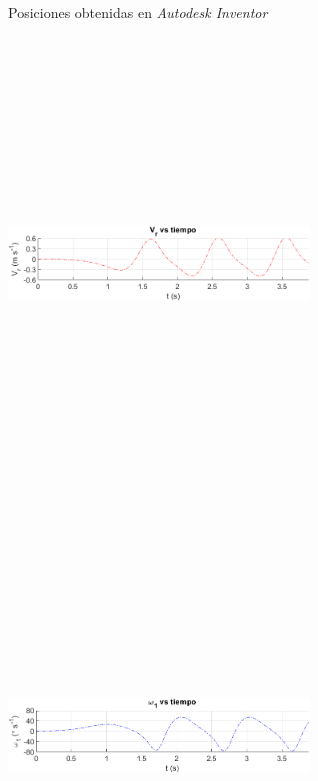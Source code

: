 \documentclass[12pt]{article}
\begin{document}
\begin{multicols}{2}
\begin{figure} [H]
        \caption{Posiciones obtenidas en \textit{Autodesk Inventor}}
        \label{}
    \end{figure}
\begin{figure} [H]
        \centerline{\includegraphics[width=8cm, height=12cm,keepaspectratio]{simulacion/vr.png}}
    \end{figure}
        \vspace{-20pt}
        \begin{figure} [H]
        \centerline{\includegraphics[width=8cm, height=12cm,keepaspectratio]{simulacion/omega1.png}}

\end{figure}
\end{multicols}
\end{document}
